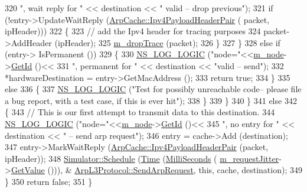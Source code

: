 \begin{DoxyCode}
320                             \textcolor{stringliteral}{", wait reply for "} << destination << \textcolor{stringliteral}{" valid -- drop previous"});
321               \textcolor{keywordflow}{if} (!entry->UpdateWaitReply (\hyperlink{classns3_1_1ArpCache_ad018741a53ccc6cdb8b05fdd4873ef3d}{ArpCache::Ipv4PayloadHeaderPair} (
      packet, ipHeader)))
322                 \{
323                   \textcolor{comment}{// add the Ipv4 header for tracing purposes}
324                   packet->AddHeader (ipHeader);
325                   \hyperlink{classns3_1_1ArpL3Protocol_ac719ebd2b108a4d342741706669d74ad}{m\_dropTrace} (packet);
326                 \}
327             \}
328           \textcolor{keywordflow}{else} \textcolor{keywordflow}{if} (entry-> IsPermanent ())
329             \{
330               \hyperlink{group__logging_ga88acd260151caf2db9c0fc84997f45ce}{NS\_LOG\_LOGIC} (\textcolor{stringliteral}{"node="}<<\hyperlink{classns3_1_1ArpL3Protocol_aa1a2d173cfb3fd7e2f8eff8504a114da}{m\_node}->\hyperlink{classns3_1_1Node_aaf49b64a843565ce3812326313b370ac}{GetId} ()<<
331                             \textcolor{stringliteral}{", permanent for "} << destination << \textcolor{stringliteral}{"valid -- send"});
332               *hardwareDestination = entry->GetMacAddress ();
333               \textcolor{keywordflow}{return} \textcolor{keyword}{true};
334             \}
335           \textcolor{keywordflow}{else}
336             \{
337               \hyperlink{group__logging_ga88acd260151caf2db9c0fc84997f45ce}{NS\_LOG\_LOGIC} (\textcolor{stringliteral}{"Test for possibly unreachable code-- please file a bug report,
       with a test case, if this is ever hit"});
338             \}
339         \}
340     \}
341   \textcolor{keywordflow}{else}
342     \{
343       \textcolor{comment}{// This is our first attempt to transmit data to this destination.}
344       \hyperlink{group__logging_ga88acd260151caf2db9c0fc84997f45ce}{NS\_LOG\_LOGIC} (\textcolor{stringliteral}{"node="}<<\hyperlink{classns3_1_1ArpL3Protocol_aa1a2d173cfb3fd7e2f8eff8504a114da}{m\_node}->\hyperlink{classns3_1_1Node_aaf49b64a843565ce3812326313b370ac}{GetId} ()<<
345                     \textcolor{stringliteral}{", no entry for "} << destination << \textcolor{stringliteral}{" -- send arp request"});
346       entry = cache->Add (destination);
347       entry->MarkWaitReply (\hyperlink{classns3_1_1ArpCache_ad018741a53ccc6cdb8b05fdd4873ef3d}{ArpCache::Ipv4PayloadHeaderPair} (packet, 
      ipHeader));
348       \hyperlink{classns3_1_1Simulator_a671882c894a08af4a5e91181bf1eec13}{Simulator::Schedule} (\hyperlink{namespacens3_1_1TracedValueCallback_a7ffd3e7c142ffe7c8a1d2db9b8de38ec}{Time} (\hyperlink{group__timecivil_gaf26127cf4571146b83a92ee18679c7a9}{MilliSeconds} (
      \hyperlink{classns3_1_1ArpL3Protocol_a0d5144a236473eb6d7153600fdd7c5ee}{m\_requestJitter}->\hyperlink{classns3_1_1RandomVariableStream_a4fa5944dc4cb11544e661ed23072b36c}{GetValue} ())), &
      \hyperlink{classns3_1_1ArpL3Protocol_a9fe6faf0f82536ba2c14d5bdbf7469db}{ArpL3Protocol::SendArpRequest}, \textcolor{keyword}{this}, cache, destination);
349     \}
350   \textcolor{keywordflow}{return} \textcolor{keyword}{false};
351 \}
\end{DoxyCode}


